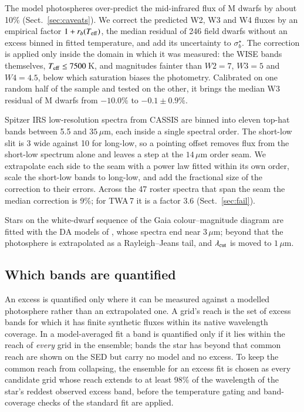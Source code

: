 \documentclass{aa}
\begin{document}
The model photospheres over-predict the mid-infrared flux of M dwarfs by about
10\% (Sect.~\ref{sec:caveats}). We correct the predicted W2, W3 and W4 fluxes by
an empirical factor $1 + r_b(T_{\rm eff})$, the median residual of 246 field
dwarfs without an excess binned in fitted temperature, and add its uncertainty to
$\sigma^\star_b$. The correction is applied only inside the domain in which it was
measured: the WISE bands themselves, $T_{\rm eff} \le 7500$\,K, and magnitudes
fainter than $W2 = 7$, $W3 = 5$ and $W4 = 4.5$, below which saturation biases the
photometry. Calibrated on one random half of the sample and tested on the other,
it brings the median W3 residual of M dwarfs from $-10.0\%$ to $-0.1 \pm 0.9\%$.

Spitzer IRS low-resolution spectra from CASSIS \citep{lebouteiller2011} are binned into eleven top-hat
bands between 5.5 and $35\,\mu$m, each inside a single spectral order. The
short-low slit is 3 wide against 10 for long-low, so a pointing
offset removes flux from the short-low spectrum alone and leaves a step at the
$14\,\mu$m order seam. We extrapolate each side to the seam with a power law
fitted within its own order, scale the short-low bands to long-low, and add the
fractional size of the correction to their errors. Across the 47 roster spectra
that span the seam the median correction is 9\%; for TWA\,7 it is a factor 3.6
(Sect.~\ref{sec:fail}).

Stars on the white-dwarf sequence of the Gaia colour--magnitude diagram are
fitted with the DA models of \citet{koester2010}, whose spectra end near $3\,\mu$m; beyond that the
photosphere is extrapolated as a Rayleigh--Jeans tail, and $\lambda_{\rm cut}$ is
moved to $1\,\mu$m.

\subsection{Which bands are quantified}
\label{sec:bandset}

An excess is quantified only where it can be measured against a modelled
photosphere rather than an extrapolated one. A grid's reach is the set of
excess bands for which it has finite synthetic fluxes within its native
wavelength coverage. In a model-averaged fit a band is quantified only if it lies
within the reach of \emph{every} grid in the ensemble; bands the star has beyond
that common reach are shown on the SED but carry no model and no excess. To keep
the common reach from collapsing, the ensemble for an excess fit is chosen as
every candidate grid whose reach extends to at least 98\% of the wavelength of the
star's reddest observed excess band, before the temperature gating and
band-coverage checks of the standard fit are applied.
\end{document}
